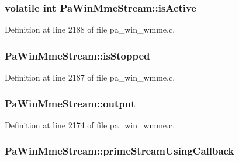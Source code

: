 \subsubsection[{\texorpdfstring{is\+Active}{isActive}}]{\setlength{\rightskip}{0pt plus 5cm}volatile {\bf int} Pa\+Win\+Mme\+Stream\+::is\+Active}\hypertarget{struct_pa_win_mme_stream_af307a61ff6b0f640d97a74559a0784e9}{}\label{struct_pa_win_mme_stream_af307a61ff6b0f640d97a74559a0784e9}


Definition at line 2188 of file pa\+\_\+win\+\_\+wmme.\+c.

\subsubsection[{\texorpdfstring{is\+Stopped}{isStopped}}]{ Pa\+Win\+Mme\+Stream\+::is\+Stopped}\hypertarget{struct_pa_win_mme_stream_a3115c68b4187cb75976b7d4b43969005}{}\label{struct_pa_win_mme_stream_a3115c68b4187cb75976b7d4b43969005}


Definition at line 2187 of file pa\+\_\+win\+\_\+wmme.\+c.

\subsubsection[{\texorpdfstring{output}{output}}]{ Pa\+Win\+Mme\+Stream\+::output}\hypertarget{struct_pa_win_mme_stream_ae1cdc398a298c9b269ff529186a0fb52}{}\label{struct_pa_win_mme_stream_ae1cdc398a298c9b269ff529186a0fb52}


Definition at line 2174 of file pa\+\_\+win\+\_\+wmme.\+c.

\subsubsection[{\texorpdfstring{prime\+Stream\+Using\+Callback}{primeStreamUsingCallback}}]{ Pa\+Win\+Mme\+Stream\+::prime\+Stream\+Using\+Callback}\hypertarget{struct_pa_win_mme_stream_a1568e3c796350c9cf01640ad1aa70c66}{}\label{struct_pa_win_mme_stream_a1568e3c796350c9cf01640ad1aa70c66}



